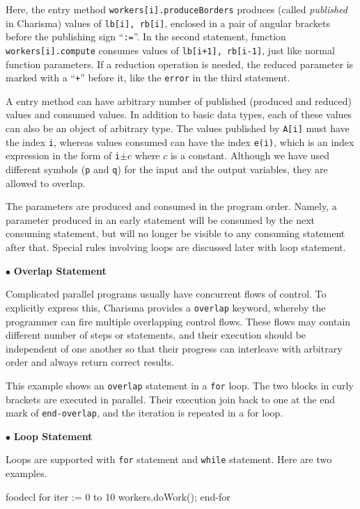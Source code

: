 \documentclass[10pt]{article}
\def\smallfbox#1{\small \fbox{#1}}
\def\code#1{{\small {\tt {#1}}}}
\begin{document}
Here, the entry method \code{workers[i].produceBorders} produces (called {\em
published} in Charisma) values of \code{lb[i], rb[i]}, enclosed in a pair of
angular brackets before the publishing sign ``\code{:=}''. In the second
statement, function \code{workers[i].compute} consumes values of \code{lb[i+1],
rb[i-1]}, just like normal function parameters. If a reduction operation is
needed, the reduced parameter is marked with a ``\code{+}'' before it, like the
\code{error} in the third statement. 

A entry method can have arbitrary number of published (produced and reduced)
values and consumed values. In addition to basic data types, each of these
values can also be an object of arbitrary type. The values published by
\code{A[i]} must have the index \code{i}, whereas values consumed can have the
index \code{e(i)}, which is an index expression in the form of \code{i}$\pm c$
where $c$ is a constant. Although we have used different symbols (\code{p} and
\code{q}) for the input and the output variables, they are allowed to overlap. 

The parameters are produced and consumed in the program order. Namely, a
parameter produced in an early statement will be consumed by the next consuming
statement, but will no longer be visible to any consuming statement after that.
Special rules involving loops are discussed later with loop statement.

$\bullet$ {\bf Overlap Statement}

Complicated parallel programs usually have concurrent flows of control. To
explicitly express this, Charisma provides a \code{overlap} keyword, whereby the
programmer can fire multiple overlapping control flows. These flows may contain
different number of steps or statements, and their execution should be
independent of one another so that their progress can interleave with arbitrary
order and always return correct results. 

This example shows an \code{overlap} statement in a \code{for} loop. The two
blocks in curly brackets are executed in parallel. Their execution join back to
one at the end mark of \code{end-overlap}, and the iteration is repeated in a
for loop. 



$\bullet$ {\bf Loop Statement}

Loops are supported with \code{for} statement and \code{while} statement. Here
are two examples.
\begin{SaveVerbatim}{foodecl}
  for iter := 0 to 10
     workers.doWork();
  end-for
\end{SaveVerbatim}
\vspace{0.1in}
\smallfbox{\BUseVerbatim{foodecl}}
\vspace{0.1in}
  
\end{document}
